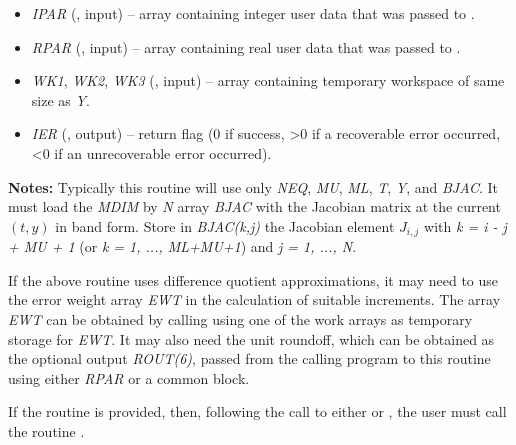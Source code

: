 \documentclass[letterpaper,10pt,english]{sphinxmanual}
\begin{document}
\begin{fulllineitems}
\begin{description}
\begin{itemize}
\item {} 
\emph{IPAR} (, input) -- array containing integer user data that was passed to
{\hyperref[f_interface/Usage:f/_/FARKMALLOC]{}}.

\item {} 
\emph{RPAR} (, input) -- array containing real user data that was passed to
{\hyperref[f_interface/Usage:f/_/FARKMALLOC]{}}.

\item {} 
\emph{WK1}, \emph{WK2}, \emph{WK3}  (, input) -- array containing temporary workspace
of same size as \emph{Y}.

\item {} 
\emph{IER} (, output) -- return flag (0 if success, \textgreater{}0 if a recoverable error
occurred, \textless{}0 if an unrecoverable error occurred).

\end{itemize}

\end{description}

\textbf{Notes:}
Typically this routine will use only \emph{NEQ}, \emph{MU}, \emph{ML}, \emph{T}, \emph{Y}, and
\emph{BJAC}. It must load the \emph{MDIM} by \emph{N} array \emph{BJAC} with the Jacobian
matrix at the current $(t,y)$ in band form.  Store in
\emph{BJAC(k,j)} the Jacobian element $J_{i,j}$ with
\emph{k = i - j + MU + 1} (or \emph{k = 1, ..., ML+MU+1}) and \emph{j = 1, ..., N}.

\end{fulllineitems}


If the above routine uses difference quotient approximations, it may
need to use the error weight array \emph{EWT} in the calculation of
suitable increments. The array \emph{EWT} can be obtained by calling
{\hyperref[f_interface/Optional_output:f/_/FARKGETERRWEIGHTS]{}} using one of the work
arrays as temporary storage for \emph{EWT}. It may also need the unit
roundoff, which can be obtained as the optional output \emph{ROUT(6)},
passed from the calling program to this routine using either \emph{RPAR}
or a common block.

If the {\hyperref[f_interface/Usage:f/_/FARKBJAC]{}} routine is provided, then, following the
call to either {\hyperref[f_interface/Usage:f/_/FARKBAND]{}} or {\hyperref[f_interface/Usage:f/_/FARKLAPACKBAND]{}}, the
user must call the routine {\hyperref[f_interface/Usage:f/_/FARKBANDSETJAC]{}}.
\end{document}
